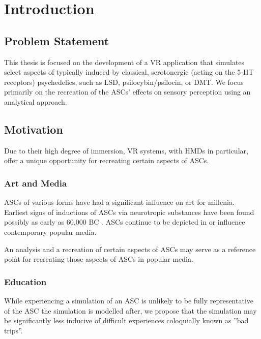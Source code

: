 \chapter{Introduction}\label{sec:introduction}
\vspace{-1.6em}
%

\minitoc
\thispagestyle{empty}
\newpage

\section{Problem Statement}
This thesis is focused on the development of a \ac{VR} application that simulates select aspects of  typically induced by classical, serotonergic (acting on the \acs{5-HT} receptors) psychedelics, such as \acs{LSD}, psilocybin/psilocin, or \acs{DMT}.
We focus primarily on the recreation of the \acp{ASC}' effects on sensory perception using an analytical approach.

\section{Motivation}
Due to their high degree of immersion, \ac{VR} systems, with \acp{HMD} in particular, offer a unique opportunity for recreating certain aspects of \acp{ASC}.

\subsection{Art and Media}
\Acp{ASC} of various forms have had a significant influence on art for millenia. Earliest signs of inductions of \acp{ASC} via neurotropic substances have been found possibly as early as 60,000 BC \autocite{guerra2015psychoactive}. \Acp{ASC} continue to be depicted in or influence contemporary popular media.

An analysis and a recreation of certain aspects of \acp{ASC} may serve as a reference point for recreating those aspects of \acp{ASC} in popular media.

\subsection{Education}
While experiencing a simulation of an \ac{ASC} is unlikely to be fully representative of the \ac{ASC} the simulation is modelled after, we propose that the simulation may be significantly less inducive of difficult experiences coloquially known as ''bad trips''.

